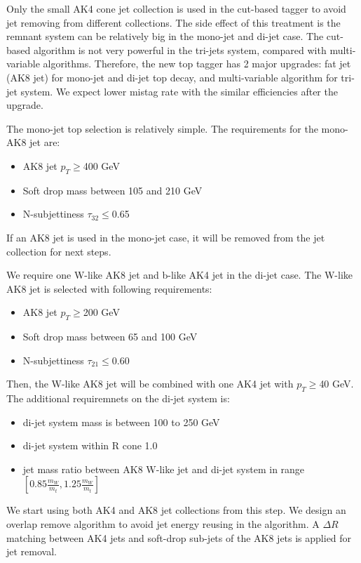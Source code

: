 Only the small AK4 cone jet collection is used in the cut-based tagger to avoid jet removing from different collections. The side effect of this treatment is the remnant system can be relatively big in the mono-jet and di-jet case. The cut-based algorithm is not very powerful in the tri-jets system, compared with multi-variable algorithms. Therefore, the new top tagger has 2 major upgrades: fat jet (AK8 jet) for mono-jet and di-jet top decay, and multi-variable algorithm for tri-jet system. We expect lower mistag rate with the similar efficiencies after the upgrade. 

The mono-jet top selection is relatively simple. The requirements for the mono-AK8 jet are:
\begin{itemize}
\item AK8 jet $p_{T}\ge$400 GeV 
\item Soft drop mass between 105 and 210 GeV
\item N-subjettiness $\tau_{32}\le$0.65
\end{itemize}

If an AK8 jet is used in the mono-jet case, it will be removed from the jet collection for next steps. 

We require one W-like AK8 jet and b-like AK4 jet in the di-jet case. The W-like AK8 jet is selected with following requirements:
\begin{itemize}
\item AK8 jet $p_{T}\ge$200 GeV
\item Soft drop mass between 65 and 100 GeV
\item N-subjettiness $\tau_{21}\le$0.60
\end{itemize}

Then, the W-like AK8 jet will be combined with one AK4 jet with $p_{T}\ge$40 GeV. The additional requiremnets on the di-jet system is:
\begin{itemize}
\item di-jet system mass is between 100 to 250 GeV
\item di-jet system within R cone 1.0
\item jet mass ratio between AK8 W-like jet and di-jet system in range $[ 0.85 \frac{m_{W}}{m_{t}}, 1.25 \frac{m_{W}}{m_{t}} ]$
\end{itemize}

We start using both AK4 and AK8 jet collections from this step. We design an overlap remove algorithm to avoid jet energy reusing in the algorithm. A $\Delta R$ matching between AK4 jets and soft-drop sub-jets of the AK8 jets is applied for jet removal. 

